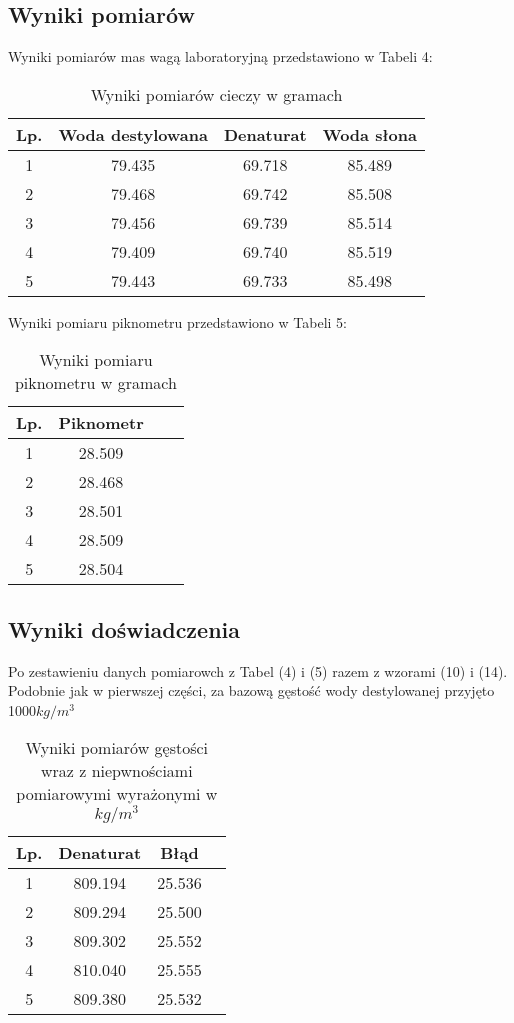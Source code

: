 \documentclass{article} %
\begin{document}
\subsection{Wyniki pomiarów}

Wyniki pomiarów mas wagą laboratoryjną przedstawiono w Tabeli 4:

\begin{table}[h!]
\centering
\begin{tabular}{|c|c|c|c|}
\hline
\textbf{Lp.} & \textbf{Woda destylowana} & \textbf{Denaturat} & \textbf{Woda słona}\\
\hline
1 & 79.435 & 69.718 & 85.489\\
2 & 79.468 & 69.742 & 85.508\\
3 & 79.456 & 69.739 & 85.514\\
4 & 79.409 & 69.740 & 85.519\\
5 & 79.443 & 69.733 & 85.498\\
\hline
\end{tabular}
\caption{Wyniki pomiarów cieczy w gramach}
\label{table:students}
\end{table}

Wyniki pomiaru piknometru przedstawiono w Tabeli 5:

\begin{table}[h!]
\centering
\begin{tabular}{|c|c|c|c|}
\hline
\textbf{Lp.} & \textbf{Piknometr}\\
\hline
1 & 28.509\\
2 & 28.468\\
3 & 28.501\\
4 & 28.509\\
5 & 28.504\\
\hline
\end{tabular}
\caption{Wyniki pomiaru piknometru w gramach}
\label{table:students}
\end{table}
\subsection{Wyniki doświadczenia}
Po zestawieniu danych pomiarowch z Tabel (4) i (5) razem z wzorami (10) i (14). Podobnie jak w pierwszej części, za bazową gęstość wody destylowanej przyjęto 1000$kg/m^3$

\begin{table}[h!]
\centering
\begin{tabular}{|c|c|c|c|}
\hline
\textbf{Lp.} & \textbf{Denaturat} & \textbf{Błąd} \\
\hline
1 & 809.194 & 25.536 \\
2 & 809.294 & 25.500 \\
3 & 809.302 & 25.552 \\
4 & 810.040 & 25.555 \\
5 & 809.380 & 25.532 \\
\hline
\end{tabular}

\caption{Wyniki pomiarów gęstości wraz z niepwnościami pomiarowymi wyrażonymi w $kg/m^3$}
\label{table:students}
\end{table}
\end{document}
